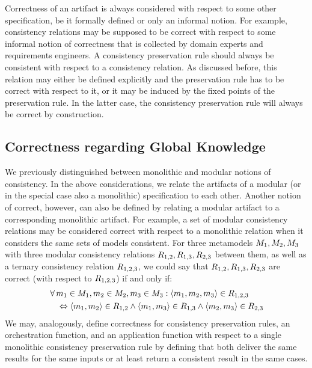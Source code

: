 Correctness of an artifact is always considered with respect to some other specification, be it formally defined or only an informal notion.
For example, consistency relations may be supposed to be correct with respect to some informal notion of correctness that is collected by domain experts and requirements engineers.
A \gls{consistency preservation rule} should always be consistent with respect to a consistency relation. As discussed before, this relation may either be defined explicitly and the preservation rule has to be correct with respect to it, or it may be induced by the fixed points of the preservation rule.
In the latter case, the \gls{consistency preservation rule} will always be correct by construction.


\subsection{Correctness regarding Global Knowledge}

We previously distinguished between monolithic and modular notions of consistency.
In the above considerations, we relate the artifacts of a modular (or in the special case also a monolithic) specification to each other.
Another notion of correct, however, can also be defined by relating a modular artifact to a corresponding monolithic artifact.
For example, a set of modular \glspl{consistency relation} may be considered correct with respect to a monolithic relation when it considers the same sets of models consistent.
For three metamodels $M_{1}, M_{2}, M_{3}$ with three modular consistency relations $R_{1,2}, R_{1,3}, R_{2,3}$ between them, as well as a ternary consistency relation $R_{1,2,3}$, we could say that $R_{1,2}, R_{1,3}, R_{2,3}$ are correct (with respect to $R_{1,2,3}$) if and only if:
\begin{align*}
    & \forall \model{m}{1} \in \metamodel{M}{1}, \model{m}{2} \in \metamodel{M}{2}, \model{m}{3} \in \metamodel{M}{3}: \tupled{\model{m}{1}, \model{m}{2}, \model{m}{3}} \in \consistencyrelation{R}{1,2,3} \\
    & \formulaskip
    \equivalent \tupled{\model{m}{1}, \model{m}{2}} \in \consistencyrelation{R}{1,2} \land \tupled{\model{m}{1}, \model{m}{3}} \in \consistencyrelation{R}{1,3} \land \tupled{\model{m}{2}, \model{m}{3}} \in \consistencyrelation{R}{2,3}
\end{align*}
%
We may, analogously, define correctness for \glspl{consistency preservation rule}, an \gls{orchestration function}, and an \gls{application function} with respect to a single monolithic \gls{consistency preservation rule} by defining that both deliver the same results for the same inputs or at least return a consistent result in the same cases.

